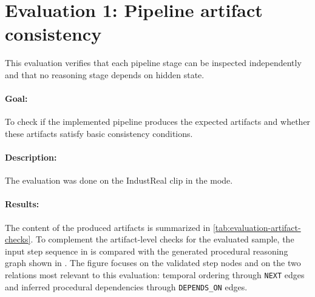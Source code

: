 \section{Evaluation 1: Pipeline artifact consistency}
\label{sec:evaluation-artifact-correctness}

This evaluation verifies that each pipeline stage can be inspected independently and
that no reasoning stage depends on hidden state.

\paragraph{Goal:}
To check if the implemented pipeline produces the expected artifacts and whether these artifacts satisfy basic consistency conditions. 

\paragraph{Description:}
The evaluation was done on the IndustReal clip  in the  mode.

\paragraph{Results:}
The content of the produced artifacts is summarized in \cref{tab:evaluation-artifact-checks}.
To complement the artifact-level checks for the evaluated sample, the input step sequence in  is compared with the generated procedural reasoning graph shown in . The figure focuses on the validated step nodes and on the two relations most relevant to this evaluation: temporal ordering through \texttt{NEXT} edges and inferred procedural dependencies through \texttt{DEPENDS\_ON} edges. 

